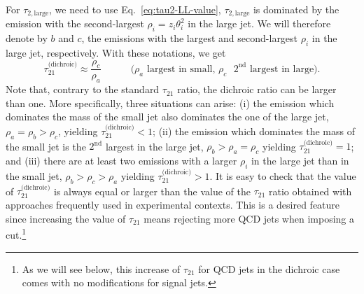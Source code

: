 For $\tau_{2,\text{large}}$, we need to use
Eq.~\eqref{eq:tau2-LL-value}, \ie $\tau_{2,\text{large}}$ is dominated
by the emission with the second-largest $\rho_i=z_i\theta_i^2$ in the
large jet. We will therefore denote by $b$ and $c$, the emissions with the
largest and second-largest $\rho_i$ in the large jet,
respectively. With these notations, we get
\begin{equation}
  \tau_{21}^{\text{(dichroic)}} \approx \frac{\rho_c}{\rho_a}\qquad\quad
  \text{($\rho_a$ largest in small, $\rho_c$ $2^\text{nd}$ largest in large)}.
\end{equation}
Note that, contrary to the standard $\tau_{21}$ ratio, the dichroic
ratio can be larger than one.
%
More specifically, three situations can arise: (i) the emission which
dominates the mass of the small jet also dominates the one of the
large jet, \ie $\rho_a=\rho_b>\rho_c$, yielding
$\tau_{21}^{\text{(dichroic)}}<1$; (ii) the emission which dominates
the mass of the small jet is the $2^\text{nd}$ largest in the large
jet, \ie $\rho_b>\rho_a=\rho_c$ yielding
$\tau_{21}^{\text{(dichroic)}}=1$; and (iii) there are at least two
emissions with a larger $\rho_i$ in the large jet than in the small
jet, \ie $\rho_b>\rho_c>\rho_a$ yielding
$\tau_{21}^{\text{(dichroic)}}>1$.
%
It is easy to check that the value of $\tau_{21}^\text{(dichroic)}$ is
always equal or larger than the value of the $\tau_{21}$ ratio obtained 
with approaches frequently used in experimental contexts.
%
 This is a desired feature since increasing the
value of $\tau_{21}$ means rejecting more QCD jets when imposing a
cut.\footnote{As we will see below, this increase of $\tau_{21}$ for
  QCD jets in the dichroic case comes with no modifications for signal
  jets.}


